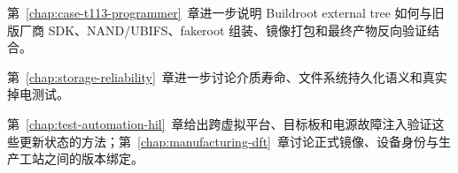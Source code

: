 第~\ref{chap:case-t113-programmer}~章进一步说明 Buildroot external tree 如何与旧版厂商 SDK、NAND/UBIFS、fakeroot 组装、镜像打包和最终产物反向验证结合。

第~\ref{chap:storage-reliability}~章进一步讨论介质寿命、文件系统持久化语义和真实掉电测试。

第~\ref{chap:test-automation-hil}~章给出跨虚拟平台、目标板和电源故障注入验证这些更新状态的方法；第~\ref{chap:manufacturing-dft}~章讨论正式镜像、设备身份与生产工站之间的版本绑定。
